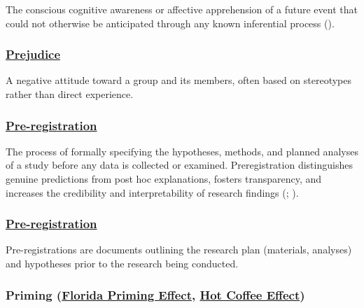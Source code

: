 \documentclass[
  letterpaper,
]{book}
\begin{document}
The conscious cognitive awareness or affective apprehension of a future
event that could not otherwise be anticipated through any known
inferential process ().

\subsubsection*{\texorpdfstring{\hyperref[def-prejudice]{Prejudice}}{Prejudice}}\label{prejudice}

A negative attitude toward a group and its members, often based on
stereotypes rather than direct experience.

\subsubsection*{\texorpdfstring{\hyperref[def-preregistration]{Pre-registration}}{Pre-registration}}\label{pre-registration}

The process of formally specifying the hypotheses, methods, and planned
analyses of a study before any data is collected or examined.
Preregistration distinguishes genuine predictions from post hoc
explanations, fosters transparency, and increases the credibility and
interpretability of research findings
(;
).

\subsubsection*{\texorpdfstring{\hyperref[def-preregistration]{Pre-registration}}{Pre-registration}}\label{pre-registration-1}

Pre-registrations are documents outlining the research plan (materials,
analyses) and hypotheses prior to the research being conducted.

\subsubsection*{\texorpdfstring{Priming (\hyperref[def-priming]{Florida
Priming Effect}, \hyperref[def-priming]{Hot Coffee
Effect})}{Priming (Florida Priming Effect, Hot Coffee Effect)}}\label{priming-florida-priming-effect-hot-coffee-effect}
\end{document}
